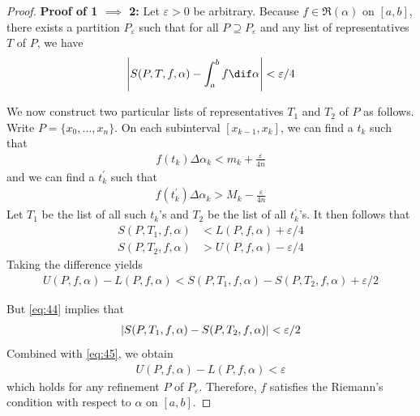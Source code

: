 \documentclass[thmcnt=section, color=blue, 12pt]{my-elegantbook}
\begin{document}
\begin{proof}
	\noindent\textbf{Proof of 1 $\implies$ 2:}
	Let $\varepsilon > 0$ be arbitrary.
	Because $f \in \mathfrak{R}(\alpha)$ on $[a, b]$,
	there exists a partition $P_\varepsilon$ such that
	for all $P \supseteq P_\varepsilon$
	and any list of representatives $T$ of $P$, we have
	\begin{align}
		\abs{ S(P, T, f, \alpha) - \int_a^b f \dif \alpha } < \varepsilon / 4
		\label{eq:44}
	\end{align}

	We now construct two particular lists of representatives
	$T_1$ and $T_2$ of $P$ as follows.
	Write $P = \{x_0, \ldots, x_n\}$.
	On each subinterval $[x_{k-1}, x_k]$,
	we can find a $t_k$ such that
	\begin{align*}
		f(t_k) \Delta \alpha_k < m_k + \frac{\varepsilon}{4n}
	\end{align*}
	and we can find a $t_k^\prime$ such that
	\begin{align*}
		f(t_k^\prime) \Delta \alpha_k > M_k - \frac{\varepsilon}{4n}
	\end{align*}
	Let $T_1$ be the list of all such $t_k$'s
	and $T_2$ be the list of all $t_k^\prime$'s.
	It then follows that
	\begin{align*}
		S(P, T_1, f, \alpha) & < L(P, f, \alpha) + \varepsilon / 4 \\
		S(P, T_2, f, \alpha) & > U(P, f, \alpha) - \varepsilon / 4
	\end{align*}
	Taking the difference yields
	\begin{align}
		U(P, f, \alpha) - L(P, f, \alpha)
		< S(P, T_1, f, \alpha) - S(P, T_2, f, \alpha) + \varepsilon/2
		\label{eq:45}
	\end{align}

	But \eqref{eq:44} implies that
	\begin{align*}
		\left\lvert S(P, T_1, f, \alpha) - S(P, T_2, f, \alpha) \right\rvert < \varepsilon/2
	\end{align*}
	Combined with \eqref{eq:45}, we obtain
	\begin{align*}
		U(P, f, \alpha) - L(P, f, \alpha) < \varepsilon
	\end{align*}
	which holds for any refinement $P$ of $P_\varepsilon$.
	Therefore, $f$ satisfies the Riemann's condition
	with respect to $\alpha$ on $[a, b]$.


\end{proof}
\end{document}
